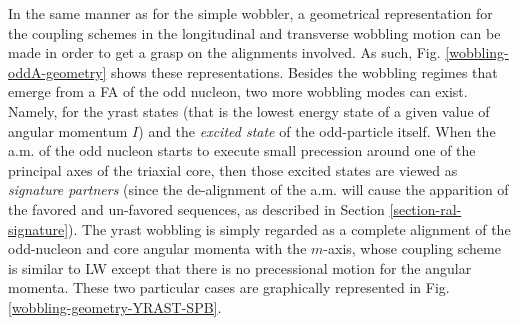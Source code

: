 In the same manner as for the simple wobbler, a geometrical representation for the coupling schemes in the longitudinal and transverse wobbling motion can be made in order to get a grasp on the alignments involved. As such, Fig. \ref{wobbling-oddA-geometry} shows these representations. Besides the wobbling regimes that emerge from a FA of the odd nucleon, two more wobbling modes can exist. Namely, for the yrast states (that is the lowest energy state of a given value of angular momentum $I$) and the \emph{excited state} of the odd-particle itself. When the a.m. of the odd nucleon starts to execute small precession around one of the principal axes of the triaxial core, then those excited states are viewed as \emph{signature partners} (since the de-alignment of the a.m. will cause the apparition of the favored and un-favored sequences, as described in Section \ref{section-ral-signature}). The yrast wobbling is simply regarded as a complete alignment of the odd-nucleon and core angular momenta with the $m$-axis, whose coupling scheme is similar to LW except that there is no precessional motion for the angular momenta. These two particular cases are graphically represented in Fig. \ref{wobbling-geometry-YRAST-SPB}.
